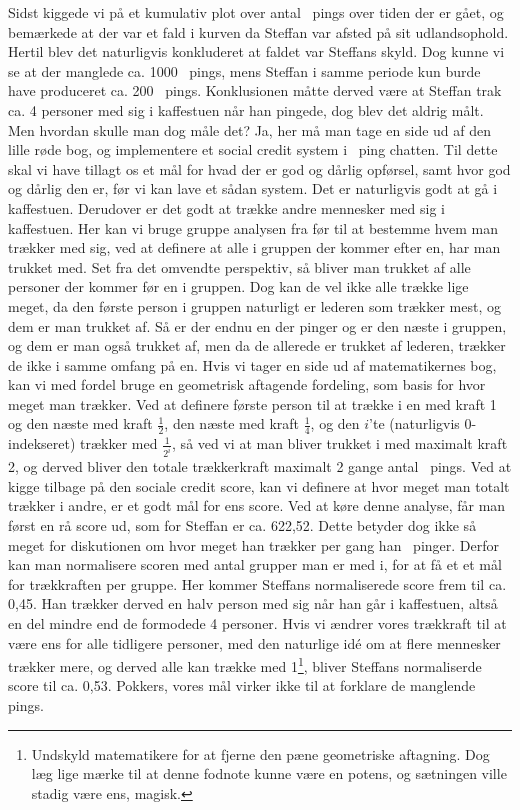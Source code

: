 \begin{article}
Sidst kiggede vi på et kumulativ plot over antal \coffee\ pings over tiden der er gået, og bemærkede at der var et fald i kurven da Steffan var afsted på sit udlandsophold. Hertil blev det naturligvis konkluderet at faldet var Steffans skyld. Dog kunne vi se at der manglede ca. 1000 \coffee\ pings, mens Steffan i samme periode kun burde have produceret ca. 200 \coffee\ pings.
Konklusionen måtte derved være at Steffan trak ca. 4 personer med sig i kaffestuen når han pingede, dog blev det aldrig målt.
Men hvordan skulle man dog måle det? Ja, her må man tage en side ud af den lille røde bog, og implementere et social credit system i \coffee\ ping chatten. Til dette skal vi have tillagt os et mål for hvad der er god og dårlig opførsel, samt hvor god og dårlig den er, før vi kan lave et sådan system. Det er naturligvis godt at gå i kaffestuen. Derudover er det godt at trække andre mennesker med sig i kaffestuen. Her kan vi bruge gruppe analysen fra før til at bestemme hvem man trækker med sig, ved at definere at alle i gruppen der kommer efter en, har man trukket med. Set fra det omvendte perspektiv, så bliver man trukket af alle personer der kommer før en i gruppen. Dog kan de vel ikke alle trække lige meget, da den første person i gruppen naturligt er lederen som trækker mest, og dem er man trukket af. Så er der endnu en der pinger og er den næste i gruppen, og dem er man også trukket af, men da de allerede er trukket af lederen, trækker de ikke i samme omfang på en.
Hvis vi tager en side ud af matematikernes bog, kan vi med fordel bruge en geometrisk aftagende fordeling, som basis for hvor meget man trækker. Ved at definere første person til at trække i en med kraft 1 og den næste med kraft $\frac{1}{2}$, den næste med kraft $\frac{1}{4}$, og den $i$'te (naturligvis 0-indekseret) trækker med $\frac{1}{2^i}$, så ved vi at man bliver trukket i med maximalt kraft 2, og derved bliver den totale trækkerkraft maximalt 2 gange antal \coffee\ pings. Ved at kigge tilbage på den sociale credit score, kan vi definere at hvor meget man totalt trækker i andre, er et godt mål for ens score.
Ved at køre denne analyse, får man først en rå score ud, som for Steffan er ca. 622,52. Dette betyder dog ikke så meget for diskutionen om hvor meget han trækker per gang han \coffee\ pinger. Derfor kan man normalisere scoren med antal grupper man er med i, for at få et et mål for trækkraften per gruppe. Her kommer Steffans normaliserede score frem til ca. 0,45. Han trækker derved en halv person med sig når han går i kaffestuen, altså en del mindre end de formodede 4 personer.
Hvis vi ændrer vores trækkraft til at være ens for alle tidligere personer, med den naturlige idé om at flere mennesker trækker mere, og derved alle kan trække med 1\footnote{Undskyld matematikere for at fjerne den pæne geometriske aftagning. Dog læg lige mærke til at denne fodnote kunne være en potens, og sætningen ville stadig være ens, magisk.}, bliver Steffans normaliserde score til ca. 0,53. Pokkers, vores mål virker ikke til at forklare de manglende pings.


\end{article}
